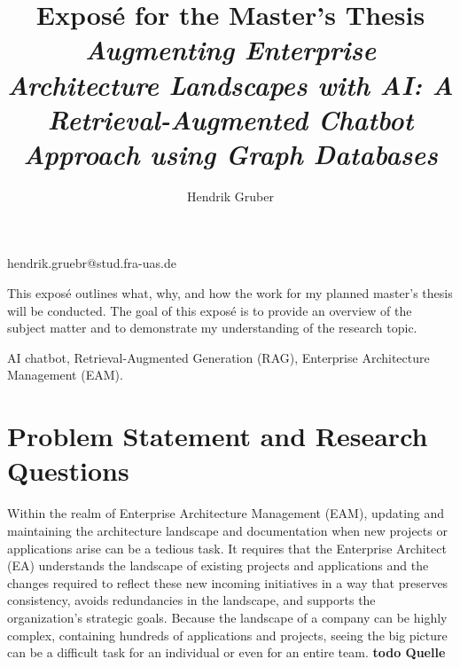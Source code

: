 \documentclass[english]{lni}
\begin{document}
\title[Ein Kurztitel]{Exposé for the Master's Thesis \textit{Augmenting Enterprise Architecture Landscapes with AI: A Retrieval-Augmented Chatbot Approach using Graph Databases}}
 \author[1]{Hendrik Gruber}{hendrik.gruebr@stud.fra-uas.de}{}
\maketitle



This exposé outlines what, why, and how the work for my planned master's thesis will be conducted. The goal of this exposé is to provide an overview of the subject matter and to demonstrate my understanding of the research topic.

\begin{keywords}
AI chatbot, Retrieval-Augmented Generation (RAG), Enterprise Architecture Management (EAM).
\end{keywords}


\section{Problem Statement and Research Questions}
Within the realm of Enterprise Architecture Management (EAM), updating and maintaining the architecture landscape and documentation when new projects or applications arise can be a tedious task. It requires that the Enterprise Architect (EA) understands the landscape of existing projects and applications and the changes required to reflect these new incoming initiatives in a way that preserves consistency, avoids redundancies in the landscape, and supports the organization's strategic goals. Because the landscape of a company can be highly complex, containing hundreds of applications and projects, seeing the big picture can be a difficult task for an individual or even for an entire team. \textbf{todo Quelle}
\end{document}
